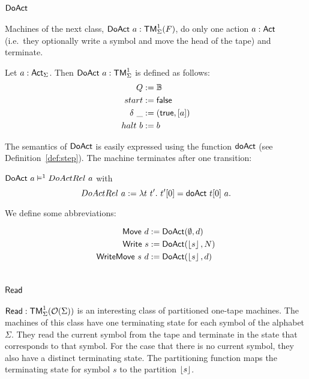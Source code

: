 \section{$\mathsf{DoAct}$}
\label{sec:DoAct}


Machines of the next class, $\mathsf{DoAct}~a : \mathsf{TM}_\Sigma^1(F)$, do only one action $a:\mathsf{Act}$ (i.e.\ they optionally write a symbol and move the head of
the tape) and terminate.
\begin{definition}[$\MS{DoAct}~a$][DoAct]
  \label{def:DoAct}
  Let $a:\mathsf{Act}_\Sigma$.  Then $\mathsf{DoAct}~a : \mathsf{TM}_\Sigma^1$ is defined as follows:
  \begin{align*}
    Q          &:= \mathbb{B} \\
    start      &:= \mathsf{false} \\
    \delta ~\_ &:= (\mathsf{true}, \left[ a \right]) \\
    halt   ~ b &:= b
  \end{align*}
\end{definition}
The semantics of $\mathsf{DoAct}$ is easily expressed using the function $\mathsf{doAct}$ (see Definition~\ref{def:step}).  The machine terminates after one
transition:
\begin{lemma}
  \label{lem:DoAct_Sem} $\mathsf{DoAct}~a \mathrel{\vDash^{1}} DoActRel~a$ with
  \[
    DoActRel~a := \lambda t~t'.~ t'[0] = \mathsf{doAct}~t[0]~a.
  \]
\end{lemma}
We define some abbreviations:
\begin{definition}
 \label{def:DoAct-derived} 
 \begin{align*}
   \mathsf{Move}       ~d &:= \mathsf{DoAct} (\emptyset, d) \\
   \mathsf{Write}    ~s   &:= \mathsf{DoAct} (\left\lfloor {s} \right\rfloor, N) \\
   \mathsf{WriteMove}~s~d &:= \mathsf{DoAct} (\left\lfloor {s} \right\rfloor, d)
 \end{align*}
\end{definition}


\section{$\mathsf{Read}$}
\label{sec:basic_machines-Read}

$\mathsf{Read} : \mathsf{TM}_\Sigma^1(\mathcal{O}(\Sigma))$ is an interesting class of partitioned one-tape machines.  The machines of this class have one terminating
state for each symbol of the alphabet $\Sigma$.  They read the current symbol from the tape and terminate in the state that corresponds to that
symbol.  For the case that there is no current symbol, they also have a distinct terminating state.  The partitioning function maps the terminating
state for symbol $s$ to the partition $\left\lfloor {s} \right\rfloor$.

